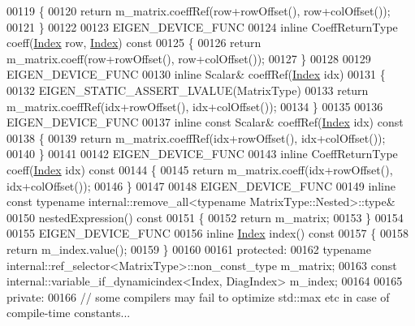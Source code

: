 \begin{DoxyCode}
00119 \textcolor{keyword}{    }\{
00120       \textcolor{keywordflow}{return} m\_matrix.coeffRef(row+rowOffset(), row+colOffset());
00121     \}
00122 
00123     EIGEN\_DEVICE\_FUNC
00124     \textcolor{keyword}{inline} CoeffReturnType coeff(\hyperlink{namespace_eigen_a62e77e0933482dafde8fe197d9a2cfde}{Index} row, \hyperlink{namespace_eigen_a62e77e0933482dafde8fe197d9a2cfde}{Index})\textcolor{keyword}{ const}
00125 \textcolor{keyword}{    }\{
00126       \textcolor{keywordflow}{return} m\_matrix.coeff(row+rowOffset(), row+colOffset());
00127     \}
00128 
00129     EIGEN\_DEVICE\_FUNC
00130     \textcolor{keyword}{inline} Scalar& coeffRef(\hyperlink{namespace_eigen_a62e77e0933482dafde8fe197d9a2cfde}{Index} idx)
00131     \{
00132       EIGEN\_STATIC\_ASSERT\_LVALUE(MatrixType)
00133       \textcolor{keywordflow}{return} m\_matrix.coeffRef(idx+rowOffset(), idx+colOffset());
00134     \}
00135 
00136     EIGEN\_DEVICE\_FUNC
00137     \textcolor{keyword}{inline} \textcolor{keyword}{const} Scalar& coeffRef(\hyperlink{namespace_eigen_a62e77e0933482dafde8fe197d9a2cfde}{Index} idx)\textcolor{keyword}{ const}
00138 \textcolor{keyword}{    }\{
00139       \textcolor{keywordflow}{return} m\_matrix.coeffRef(idx+rowOffset(), idx+colOffset());
00140     \}
00141 
00142     EIGEN\_DEVICE\_FUNC
00143     \textcolor{keyword}{inline} CoeffReturnType coeff(\hyperlink{namespace_eigen_a62e77e0933482dafde8fe197d9a2cfde}{Index} idx)\textcolor{keyword}{ const}
00144 \textcolor{keyword}{    }\{
00145       \textcolor{keywordflow}{return} m\_matrix.coeff(idx+rowOffset(), idx+colOffset());
00146     \}
00147 
00148     EIGEN\_DEVICE\_FUNC
00149     \textcolor{keyword}{inline} \textcolor{keyword}{const} \textcolor{keyword}{typename} internal::remove\_all<typename MatrixType::Nested>::type& 
00150     nestedExpression()\textcolor{keyword}{ const }
00151 \textcolor{keyword}{    }\{
00152       \textcolor{keywordflow}{return} m\_matrix;
00153     \}
00154 
00155     EIGEN\_DEVICE\_FUNC
00156     \textcolor{keyword}{inline} \hyperlink{namespace_eigen_a62e77e0933482dafde8fe197d9a2cfde}{Index} index()\textcolor{keyword}{ const}
00157 \textcolor{keyword}{    }\{
00158       \textcolor{keywordflow}{return} m\_index.value();
00159     \}
00160 
00161   \textcolor{keyword}{protected}:
00162     \textcolor{keyword}{typename} internal::ref\_selector<MatrixType>::non\_const\_type m\_matrix;
00163     \textcolor{keyword}{const} internal::variable\_if\_dynamicindex<Index, DiagIndex> m\_index;
00164 
00165   \textcolor{keyword}{private}:
00166     \textcolor{comment}{// some compilers may fail to optimize std::max etc in case of compile-time constants...}

\end{DoxyCode}

